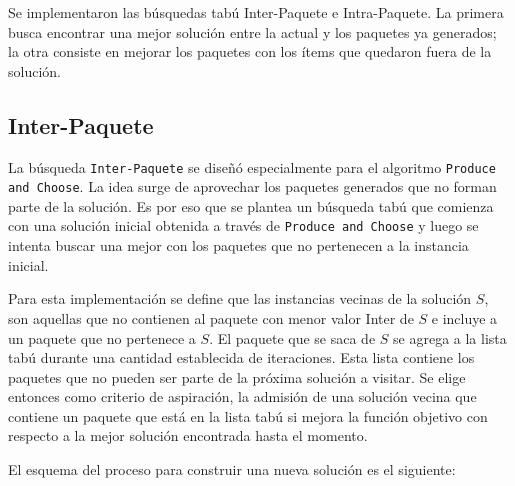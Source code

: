 Se implementaron las búsquedas tabú Inter-Paquete e Intra-Paquete. La primera busca encontrar una mejor solución entre la actual y los paquetes ya generados; la otra consiste en mejorar los paquetes con los ítems que quedaron fuera de la solución.

\subsection{Inter-Paquete}
La búsqueda \texttt{Inter-Paquete} se diseñó especialmente para el algoritmo \texttt{Produce and Choose}. La idea surge de aprovechar los paquetes generados que no forman parte de la solución. Es por eso que se plantea un búsqueda tabú que comienza con una solución inicial obtenida a través de \texttt{Produce and Choose} y luego se intenta buscar una mejor con los paquetes que no pertenecen a la instancia inicial. 

Para esta implementación se define que las instancias vecinas de la solución $S$, son aquellas que no contienen al paquete con menor valor Inter de $S$ e incluye a un paquete que no pertenece a $S$. El paquete que se saca de $S$ se agrega a la lista tabú durante una cantidad establecida de iteraciones. Esta lista contiene los paquetes que no pueden ser parte de la próxima solución a visitar. Se elige entonces como criterio de aspiración, la admisión de una solución vecina que contiene un paquete que está en la lista tabú si mejora la función objetivo con respecto a la mejor solución encontrada hasta el momento. 

El esquema del proceso para construir una nueva solución es el siguiente:

